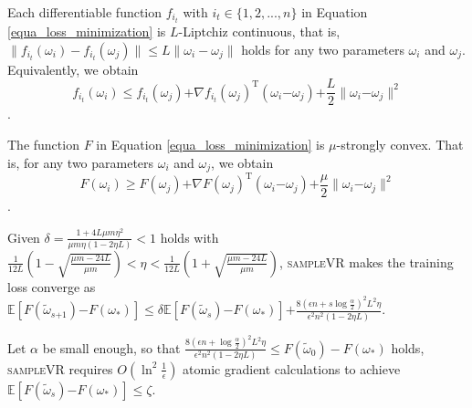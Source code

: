 \documentclass[letterpaper]{article}
\begin{document}
\begin{Assumption}
\label{assumption_liptchiz}
Each  differentiable function $f_{i_t}$ with $i_t\in\{1,2, ..., n\}$ in Equation \ref{equa_loss_minimization} is $L$-Liptchiz continuous, that is,  $\parallel  f_{i_t}(\omega_i) - f_{i_t}(\omega_j)  \parallel \le L \parallel \omega_i - \omega_j    \parallel$ holds for any two parameters $\omega_i$ and $\omega_j$. Equivalently, we obtain
$$
f_{i_t}(\omega_i)\le f_{i_t}(\omega_j)\mathrm{+}\nabla f_{i_t}(\omega_j)^\mathrm{T} (\omega_i\mathrm{-}\omega_j)\mathrm{+}\frac{L}{2}\parallel \omega_i\mathrm{-}\omega_j\parallel^2
$$.
\end{Assumption}

\begin{Assumption}
\label{assumption_strongly_convex}
The function $F$ in Equation \ref{equa_loss_minimization} is $\mu$-strongly convex. That is, for any two parameters $\omega_i$ and $\omega_j$, we obtain
$$
F(\omega_i)\ge F(\omega_j)\mathrm{+}\nabla F(\omega_j)^\mathrm{T} (\omega_i\mathrm{-}\omega_j)\mathrm{+}\frac{\mu}{2}\parallel \omega_i\mathrm{-}\omega_j\parallel^2 
$$.
\end{Assumption}

\begin{Theorem}
\label{Theorem_converge}
Given $\delta=\frac{1+4L\mu m \eta^2}{  \mu m \eta (1-2\eta L)  } < 1$ holds with $\frac{1}{12L}\left( 1- \sqrt{\frac{\mu m - 24L}{\mu m}} \right) < \eta < \frac{1}{12L}\left( 1+ \sqrt{\frac{\mu m - 24L}{\mu m}} \right)$, \textsc{sampleVR} makes the training loss converge as
$\mathbb{E}[F(\tilde{\omega}_{s\mathrm{+}1}) \mathrm{-} F(\omega_\ast)]  \le \delta \mathbb{E}[F(\tilde{\omega}_s)\mathrm{-}F(\omega_\ast)] \mathrm{+} \frac{8(\epsilon n+s\log\frac{\alpha}{2})^2L^2\eta}{\epsilon^2n^2(1-2\eta L)}$.
\end{Theorem}

%

\begin{Theorem}
\label{theorem_gradient_complexity}
Let $\alpha$ be small enough, so that $\frac{8(\epsilon n+\log\frac{\alpha}{2})^2L^2\eta}{\epsilon^2n^2(1-2\eta L)}\le F(\tilde{\omega}_0) - F(\omega_\ast)$ holds, \textsc{sampleVR} requires $O(\ln^2\frac{1}{\epsilon})$ atomic gradient calculations  to achieve $\mathbb{E}[F(\tilde{\omega}_s)\mathrm{-}F(\omega_\ast)] \le \zeta$.
\end{Theorem}
\end{document}
